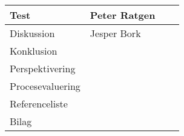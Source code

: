 \begin{table}[h!]
\begin{tabular}{|p{45mm}|p{30mm}|p{30mm}|p{35mm}|}
        Test                   & Peter Ratgen     &          &  \\ \hline
        Diskussion             & Jesper Bork      &          &  \\ \hline
        Konklusion             &                  &          &  \\ \hline
        Perspektivering        &                  &          &  \\ \hline
        Procesevaluering       &                  &          &  \\ \hline
        Referenceliste         &                  &          &  \\ \hline
        Bilag                  &                  &          &  \\ \hline
    \end{tabular}
\end{table}

\clearpage
